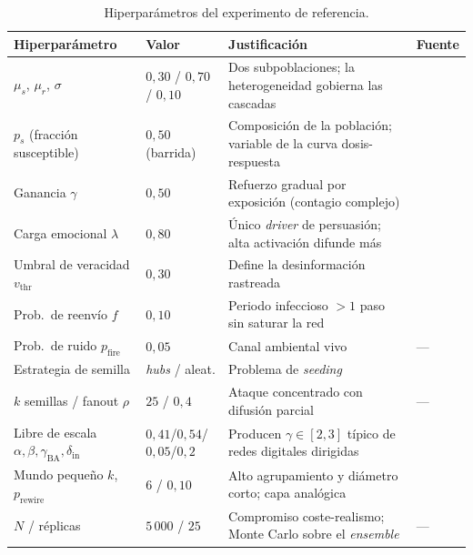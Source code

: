 \begin{table}[ht]
  \centering
  \small
  \caption{Hiperparámetros del experimento de referencia.}
  \label{tab:hiperparametros}
  \begin{tabular}{@{}p{3.2cm} p{2.4cm} p{5.2cm} l@{}}
    \toprule
    \textbf{Hiperparámetro} & \textbf{Valor} & \textbf{Justificación} & \textbf{Fuente} \\
    \midrule
    $\mu_s$, $\mu_r$, $\sigma$ & $0{,}30$ / $0{,}70$ / $0{,}10$ & Dos subpoblaciones; la heterogeneidad gobierna las cascadas & \cite{Granovetter1978,Watts2002} \\
    \addlinespace
    $p_s$ (fracción susceptible) & $0{,}50$ (barrida) & Composición de la población; variable de la curva dosis-respuesta & \cite{Watts2002} \\
    \addlinespace
    Ganancia $\gamma$ & $0{,}50$ & Refuerzo gradual por exposición (contagio complejo) & \cite{CentolaMacy2007} \\
    \addlinespace
    Carga emocional $\lambda$ & $0{,}80$ & Único \emph{driver} de persuasión; alta activación difunde más & \cite{Vosoughi2018} \\
    \addlinespace
    Umbral de veracidad $v_{\mathrm{thr}}$ & $0{,}30$ & Define la desinformación rastreada & \cite{Vosoughi2018} \\
    \addlinespace
    Prob.\ de reenvío $f$ & $0{,}10$ & Periodo infeccioso $> 1$ paso sin saturar la red & \cite{KempeKleinbergTardos2003} \\
    \addlinespace
    Prob.\ de ruido $p_{\mathrm{fire}}$ & $0{,}05$ & Canal ambiental vivo & --- \\
    \addlinespace
    Estrategia de semilla & \emph{hubs} / aleat. & Problema de \emph{seeding} & \cite{KempeKleinbergTardos2003} \\
    \addlinespace
    $k$ semillas / fanout $\rho$ & $25$ / $0{,}4$ & Ataque concentrado con difusión parcial & --- \\
    \addlinespace
    Libre de escala $\alpha,\beta,\gamma_{\mathrm{BA}},\delta_{\mathrm{in}}$ & $0{,}41$/$0{,}54$/$0{,}05$/$0{,}2$ & Producen $\gamma \in [2, 3]$ típico de redes digitales dirigidas & \cite{Bollobas2003} \\
    \addlinespace
    Mundo pequeño $k$, $p_{\mathrm{rewire}}$ & $6$ / $0{,}10$ & Alto agrupamiento y diámetro corto; capa analógica & \cite{WattsStrogatz1998} \\
    \addlinespace
    $N$ / réplicas & $5\,000$ / $25$ & Compromiso coste-realismo; Monte Carlo sobre el \emph{ensemble} & --- \\
    \bottomrule
  \end{tabular}
\end{table}

